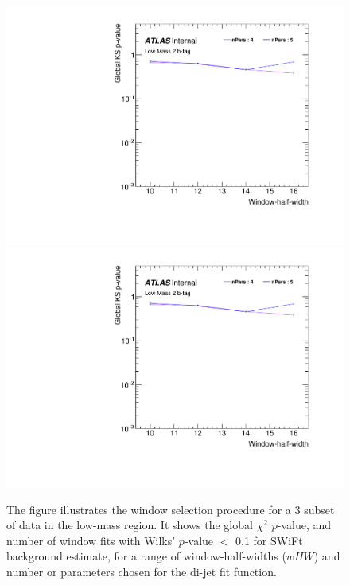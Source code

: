 \begin{figure}[!htb]
\captionsetup[subfigure]{aboveskip=0pt,justification=centering}
\centering
{} {
  \includegraphics[width=0.51\linewidth, angle=0,page=2]{figs/Dibjet/LowMass/FitStudy/windowSel_subset.pdf}
}\hspace{-8mm}
 {
  \includegraphics[width=0.51\linewidth, angle=0,page=4]{figs/Dibjet/LowMass/FitStudy/windowSel_subset.pdf}
}
\vspace{10pt}
\caption{\label{fig:windowSel_subset}
  The figure illustrates the window selection procedure for a 3\ifb{} subset of data in the low-mass region.
  It shows the global $\chi^{2}$ $p$-value, %
  and number of window fits with Wilks' $p$-value $<$ 0.1 for SWiFt background estimate,
  for a range of window-half-widths ($wHW$) and number or parameters chosen for the di-jet fit function.
}
\end{figure}


